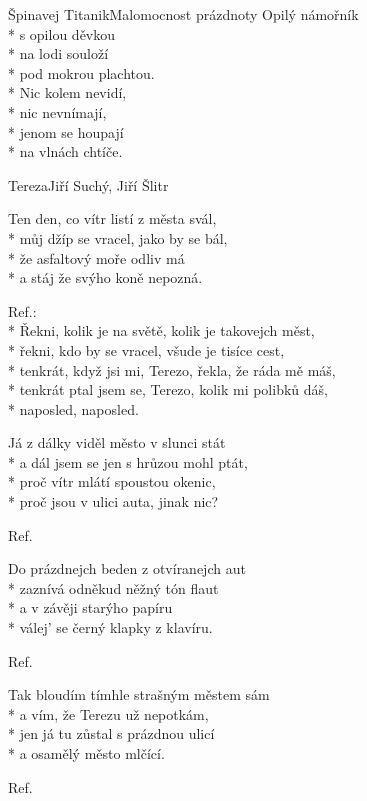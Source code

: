 \documentclass[10.5pt]{book}
\begin{document}
\begin{poem}{Špinavej Titanik}{Malomocnost prázdnoty}
Opilý námořník\\*
s opilou děvkou\\*
na lodi souloží\\*
pod mokrou plachtou.\\*
Nic kolem nevidí,\\*
nic nevnímají,\\*
jenom se houpají\\*
na vlnách chtíče.

\end{poem}

\begin{poem}{Tereza}{Jiří Suchý, Jiří Šlitr}

\settowidth{\versewidth}{snad ke štěstí, snad do záhuby}

Ten den, co vítr listí z města svál, \\*
můj džíp se vracel, jako by se bál, \\*
že asfaltový moře odliv má \\*
a stáj že svýho koně nepozná. 

Ref.:\\*
Řekni, kolik je na světě, kolik je takovejch měst, \\*
řekni, kdo by se vracel, všude je tisíce cest, \\*
tenkrát, když jsi mi, Terezo, řekla, že ráda mě máš, \\*
tenkrát ptal jsem se, Terezo, kolik mi polibků dáš,\\*
naposled, naposled. 

Já z dálky viděl město v slunci stát \\*
a dál jsem se jen s hrůzou mohl ptát, \\*
proč vítr mlátí spoustou okenic, \\*
proč jsou v ulici auta, jinak nic?

Ref.

Do prázdnejch beden z otvíranejch aut \\*
zaznívá odněkud něžný tón flaut \\*
a v závěji starýho papíru \\*
válej' se černý klapky z klavíru. 

Ref.

Tak bloudím tímhle strašným městem sám \\*
a vím, že Terezu už nepotkám, \\*
jen já tu zůstal s prázdnou ulicí\\* 
a osamělý město mlčící. 

Ref.

\end{poem}
\end{document}
